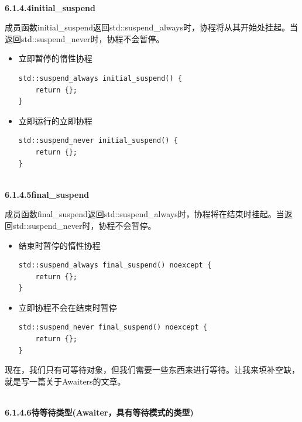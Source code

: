\hspace*{\fill} \\ %
\noindent
\textbf{6.1.4.4\hspace{0.2cm}initial\_suspend}

成员函数initial\_suspend返回std::suspend\_always时，协程将从其开始处挂起。当返回std::suspend\_never时，协程不会暂停。

\begin{itemize}
\item 
立即暂停的惰性协程

\begin{lstlisting}[style=styleCXX]
std::suspend_always initial_suspend() {
	return {};
}
\end{lstlisting}

\item 
立即运行的立即协程

\begin{lstlisting}[style=styleCXX]
std::suspend_never initial_suspend() {
	return {};
}
\end{lstlisting}
\end{itemize}


\hspace*{\fill} \\ %
\noindent
\textbf{6.1.4.5\hspace{0.2cm}final\_suspend}

成员函数final\_suspend返回std::suspend\_always时，协程将在结束时挂起。当返回std::suspend\_never时，协程不会暂停。

\begin{itemize}
\item 
结束时暂停的惰性协程

\begin{lstlisting}[style=styleCXX]
std::suspend_always final_suspend() noexcept {
	return {};
}
\end{lstlisting}

\item 
立即协程不会在结束时暂停

\begin{lstlisting}[style=styleCXX]
std::suspend_never final_suspend() noexcept {
	return {};
}
\end{lstlisting}
\end{itemize}

现在，我们只有可等待对象，但我们需要一些东西来进行等待。让我来填补空缺，就是写一篇关于Awaiters的文章。

\hspace*{\fill} \\ %
\noindent
\textbf{6.1.4.6\hspace{0.2cm}待等待类型(Awaiter，具有等待模式的类型)}

